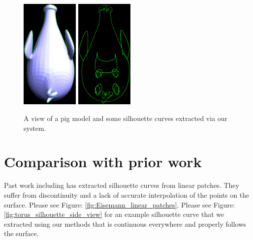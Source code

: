 \documentclass[12pt, letterpaper]{article}
\begin{document}
\begin{figure}[h]
\centering
\includegraphics[width=0.25\textwidth]{Pig_patched}
\includegraphics[width=0.25\textwidth]{Pig_silhouettes}
\caption{A view of a pig model and some silhouette curves extracted via our system.}
\label{fig:pig_silhouettes}
\end{figure}


\section{Comparison with prior work}

Past work including \cite{Eisemann08} has extracted silhouette curves from linear patches. They suffer from discontinuity and a lack of accurate interpolation of the points on the surface.
Please see Figure: \ref{fig:Eisemann_linear_patches}. Please see Figure: \ref{fig:torus_silhouette_side_view} for an example silhouette curve that we extracted using our methods that is continuous everywhere and properly follows the surface.
\end{document}
